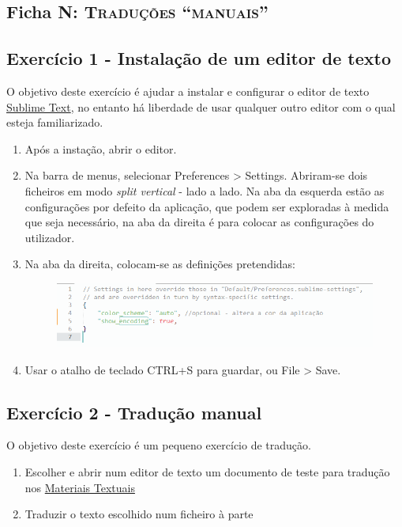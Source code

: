 \documentclass[10pt,a4paper,notitlepage]{article}
\begin{document}
\begin{center}
\section*{Ficha N: \textsc{Traduções ``manuais''}}
\end{center}

\subsection*{Exercício 1 - Instalação de um editor de texto}
O objetivo deste exercício é ajudar a instalar e configurar o editor de texto \href{https://www.sublimetext.com}{Sublime Text}, no entanto há liberdade de usar qualquer outro editor com o qual esteja familiarizado.
    \begin{enumerate}
        \item Após a instação, abrir o editor.
        \item Na barra de menus, selecionar Preferences > Settings. Abriram-se dois ficheiros em modo \textit{split vertical} - lado a lado. Na aba da esquerda estão as configurações por defeito da aplicação, que podem ser exploradas à medida que seja necessário, na aba da direita é para colocar as configurações do utilizador. 
        \item Na aba da direita, colocam-se as definições pretendidas:      
        \begin{figure}[h!]
            \hspace{2em}
            \includegraphics[width=.7\textwidth]{sublime.png}
            \label{fig:enter-label}
        \end{figure}
        \item Usar o atalho de teclado CTRL+S para guardar, ou File > Save.
    \end{enumerate}

\subsection*{Exercício 2 - Tradução manual}
O objetivo deste exercício é um pequeno exercício de tradução.
\begin{enumerate}
    \item Escolher e abrir num editor de texto um documento de teste para tradução nos \href{https://jjoao.github.io/ftt2023/materiaistextuais}{Materiais Textuais}
    \item Traduzir o texto escolhido num ficheiro à parte
\end{enumerate}
\end{document}

